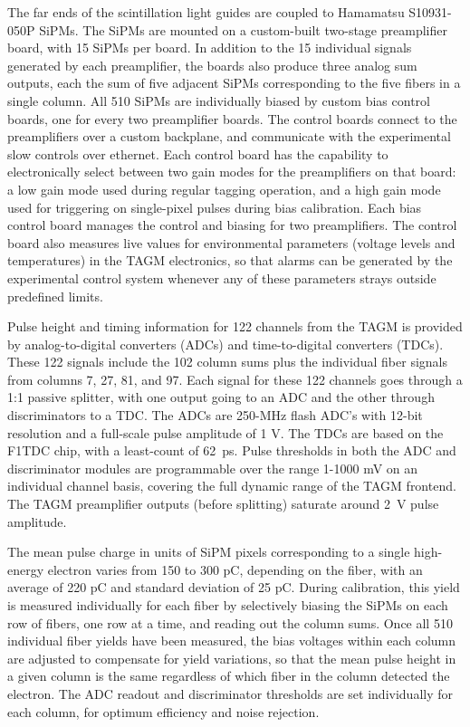 The far ends of the scintillation light guides are coupled to Hamamatsu S10931-050P SiPMs. The SiPMs are mounted on a custom-built two-stage preamplifier board, with 15 SiPMs per board. In addition to the 15 individual signals generated
by each preamplifier, the boards also produce three analog sum outputs, each the sum
of five adjacent SiPMs corresponding to the five fibers in a single column. All 510
SiPMs are individually biased by custom bias control boards, one for every two
preamplifier boards. The control boards connect to the
preamplifiers over a custom backplane, and communicate with the
experimental slow controls over ethernet. Each control board has the
capability to electronically select between two gain modes for the preamplifiers
on that board:
a low gain mode used during regular tagging operation, and a high gain
mode used for triggering on single-pixel pulses during bias calibration.
Each bias control board manages the control and biasing for two preamplifiers.
The control board also measures live values for environmental parameters
(voltage levels and temperatures) in the TAGM electronics, so that alarms can
be generated by the experimental control system whenever any of these parameters
strays outside predefined limits.

Pulse height and timing information for 122 channels from the TAGM is provided by analog-to-digital converters (ADCs) and time-to-digital converters (TDCs). These 122
signals include the 102 column sums plus the individual fiber signals from
columns 7, 27, 81, and 97. Each signal for these 122 channels goes through a 1:1
passive splitter, with one output going to an ADC and the other through
discriminators to a TDC. The ADCs are 250-MHz flash ADC's with 12-bit
resolution and a full-scale pulse amplitude of 1 V. The TDCs are based
on the F1TDC chip, with a least-count of 62~ps. Pulse thresholds in both
the ADC and discriminator modules are programmable over the range 1-1000 mV
on an individual channel basis, covering the full dynamic range of the TAGM
frontend. The TAGM preamplifier outputs (before splitting) saturate around
2~V pulse amplitude.

The mean pulse charge in units of SiPM pixels corresponding to a
single high-energy electron varies from 150 to 300 pC, depending on the fiber,
with an average of 220 pC and standard deviation of 25 pC. During calibration,
this yield is measured individually for each fiber by selectively biasing
the SiPMs on each row of fibers, one row at a time, and reading out the column
sums. Once all 510 individual fiber yields have been measured, the bias voltages
within each column are adjusted to compensate for yield variations, so
that the mean pulse height in a given column is the same regardless of which
fiber in the column detected the electron. The ADC readout and discriminator
thresholds are set individually for each column, for optimum efficiency and
noise rejection.

